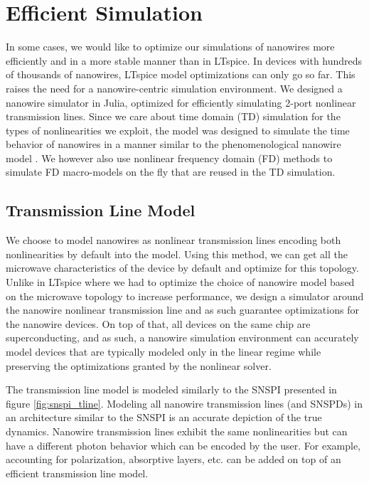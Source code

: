 \chapter{Efficient Simulation} \label{julia-sim-chapter}

In some cases, we would like to optimize our simulations of nanowires more efficiently and in a 
more stable manner than in LTspice. In devices with hundreds of thousands of nanowires, LTspice
model optimizations can only go so far. This raises the need for a nanowire-centric simulation
environment. We designed a nanowire simulator in Julia, optimized for efficiently simulating 2-port 
nonlinear transmission lines. Since we care about time domain (TD) simulation for the types of nonlinearities
we exploit, the model was designed to simulate the time behavior of nanowires in a manner
similar to the phenomenological nanowire model \cite{phen_model}. We however also use
nonlinear frequency domain (FD) methods to simulate FD macro-models on the fly that are reused in the
TD simulation.


\section{Transmission Line Model}

We choose to model nanowires as nonlinear transmission lines encoding both nonlinearities
by default into the model. Using this method, we can get all the microwave characteristics of
the device by default and optimize for this topology. Unlike in LTspice where we had to optimize
the choice of nanowire model based on the microwave topology to increase performance, we design
a simulator around the nanowire nonlinear transmission line and as such guarantee optimizations
for the nanowire devices. On top of that, all devices on the same chip are superconducting, and
as such, a nanowire simulation environment can accurately model devices that are typically 
modeled only in the linear regime while preserving the optimizations granted by the nonlinear
solver.

The transmission line model is modeled similarly to the SNSPI presented in figure 
\ref{fig:snspi_tline}. Modeling all nanowire transmission lines (and SNSPDs) in an architecture similar to
the SNSPI is an accurate depiction of the true dynamics. Nanowire transmission lines exhibit the same
nonlinearities but can have a different photon behavior which can be encoded by the user. For example,
accounting for polarization, absorptive layers, etc. can be added on top of an efficient transmission line
model.

